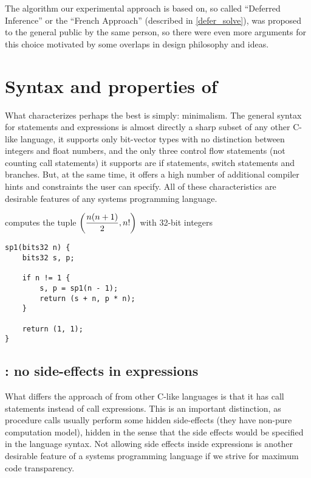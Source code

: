 The algorithm our experimental approach is based on, so called ``Deferred Inference'' or the ``French Approach'' (described in \cref{defer_solve}), was proposed to the general public by the same person, so there were even more arguments for this choice motivated by some overlaps in design philosophy and ideas.

\section{Syntax and properties of \cmm{}}

What characterizes \cmm{} perhaps the best is simply: minimalism. The general syntax for statements and expressions is almost directly a sharp subset of any other C-like language, it supports only bit-vector types with no distinction between integers and float numbers, and the only three control flow statements (not counting call statements) it supports are if statements, switch statements and branches. But, at the same time, it offers a high number of additional compiler hints and constraints the user can specify. All of these characteristics are desirable features of any systems programming language.

\begin{ex}
     computes the tuple $\left(\dfrac{n(n+1)}{2}, n!\right)$ with 32-bit integers
    \begin{lstlisting}
sp1(bits32 n) {
    bits32 s, p;

    if n != 1 {
        s, p = sp1(n - 1);
        return (s + n, p * n);
    }

    return (1, 1);
}
    \end{lstlisting}
\end{ex}

\subsection{\cmm{}: no side-effects in expressions}

What differs the approach of \cmm{} from other C-like languages is that it has call statements instead of call expressions. This is an important distinction, as procedure calls usually perform some hidden side-effects (they have non-pure computation model), hidden in the sense that the side effects would be specified in the language syntax. Not allowing side effects inside expressions is another desirable feature of a systems programming language if we strive for maximum code transparency.

